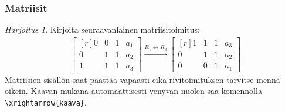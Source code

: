 \documentclass[handout,hyperref={colorlinks=true}]{beamer}
\theoremstyle{remark}
\newtheorem{harj}{Harjoitus}[section]
\begin{document}
\begin{frame}[fragile]
    \frametitle{Matriisit}
    \begin{harj}
        Kirjoita seuraavanlainen matriisitoimitus: 
        \begin{align*}
            &
            \begin{bmatrix*}[r]
                0 & 0 & 1 & a_1\\
                0 & 1 & 1 & a_2\\
                1 & 1 & 1 & a_3
            \end{bmatrix*}
        \xrightarrow{R_1\leftrightarrow R_3}
            \begin{bmatrix*}[r]
                1 & 1 & 1 & a_3\\
                0 & 1 & 1 & a_2\\
                0 & 0 & 1 & a_1
            \end{bmatrix*}
        \end{align*}
        Matriisien sisällön saat päättää vapaasti eikä rivitoimituksen tarvitse mennä oikein. %
        Kaavan mukana automaattisesti venyvän nuolen saa komennolla \verb-\xrightarrow{kaava}-.

    \end{harj}
\end{frame}
\end{document}

